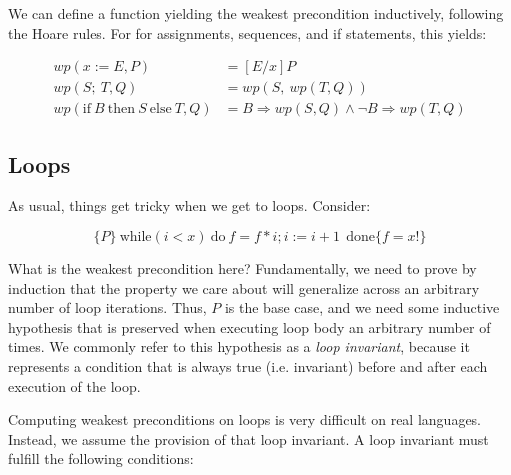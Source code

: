 \documentclass[11pt]{article}
\begin{document}
\iffalse \textbf{WORKSHEET EXAMPLES} \fi


We can define a function yielding the weakest precondition inductively,
following the Hoare rules.  For for assignments, sequences, and if
statements, this yields:

\[
\begin{array}{ll}
wp(x := E, P) & = [E/x] P
\\[1ex]
wp(S;~ T, Q) & = wp(S, ~wp(T, Q))
\\[1ex]
wp(\mbox{if}~ B ~\mbox{then}~ S ~\mbox{else}~ T, Q) & = B \Rightarrow wp(S,Q) \land \lnot B \Rightarrow wp(T,Q)
\end{array}
\]
\iffalse
\textbf{PROBABLY DON'T HAVE TIME:}
 exercise:
 Fill in the missing pre- or post-conditions with predicates that make each Hoare triple valid.
 {x=y} x:=y*2 {      }
 {      } x:=x+3{x=z}
 {       } x:=x+1;y:=y*x{y=2*z}
 {       } if (x>0) then y:=x else y:=0 {y>0}
\fi

\subsection{Loops}

As usual, things get tricky when we get to loops.  Consider:

\begin{center}
\[
\{P\}~\mbox{while} (i<x)~ \mbox{do}~f=f*i; i:=i+1~~ \mbox{done} \{f=x!\}
\]
\end{center}

What is the weakest precondition here?  Fundamentally, we
need to prove by induction that the property we care about will generalize
across an arbitrary number of loop iterations.  Thus, $P$ is the base case,
and we need some inductive hypothesis that is preserved when executing loop body
an arbitrary number of times. We commonly refer to this hypothesis as a \textit{loop
  invariant}, because it represents a condition that is always true
(i.e. invariant) before and after each execution of the loop.

Computing weakest preconditions on loops is very difficult on real languages.
Instead, we assume the provision of that loop invariant.  A loop invariant must
fulfill the following conditions:
\end{document}
